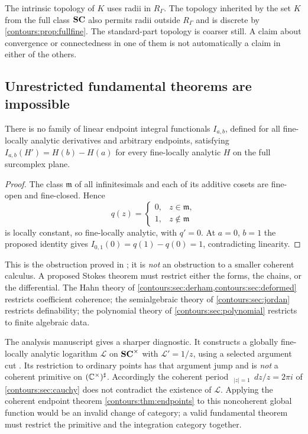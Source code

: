 \documentclass[11pt,letterpaper]{article}
\theoremstyle{definition}
\theoremstyle{remark}
\newcommand{\m}{\mathfrak m}\newcommand{\st}{\operatorname{st}}
\newcommand{\HCoint}{\mathop{\oint^{\!H}}\nolimits}
\newcommand{\sh}{^{\sharp}}\newcommand{\dd}{\,d}
\numberwithin{equation}{section}
\begin{document}
\begin{remark}
\label{contours:rem:threetopologies}
The intrinsic topology of $K$ uses radii in $R_\Gamma$. The topology inherited by
the set $K$ from the full class $\mathbf{SC}$ also permits radii outside $R_\Gamma$ and is
discrete by \cref{contours:prop:fullfine}. The standard-part topology is coarser
still. A claim about convergence or connectedness in one of them is not
automatically a claim in either of the others.
\end{remark}

\subsection{Unrestricted fundamental theorems are impossible}
\begin{proposition}
\label{contours:prop:noftc}
There is no family of linear endpoint integral functionals $I_{a,b}$, defined for
all fine-locally analytic derivatives and arbitrary endpoints, satisfying
$I_{a,b}(H')=H(b)-H(a)$ for every fine-locally analytic $H$ on the full surcomplex
plane.
\end{proposition}
\begin{proof}
The class $\m$ of all infinitesimals and each of its additive cosets are fine-open
and fine-closed. Hence
\[
  q(z)=\begin{cases}0,&z\in\m,\\ 1,&z\notin\m\end{cases}
\]
is locally constant, so fine-locally analytic, with $q'=0$. At $a=0$, $b=1$ the
proposed identity gives $I_{0,1}(0)=q(1)-q(0)=1$, contradicting linearity.
\end{proof}

This is the obstruction proved in \cite[\S3]{Analysis}; it is \emph{not} an
obstruction to a smaller coherent calculus. A proposed Stokes theorem must restrict
either the forms, the chains, or the differential. The Hahn theory of
\cref{contours:sec:derham,contours:sec:deformed} restricts coefficient coherence;
the semialgebraic theory of \cref{contours:sec:jordan} restricts definability; the
polynomial theory of \cref{contours:sec:polynomial} restricts to finite algebraic
data.

The analysis manuscript gives a sharper diagnostic. It constructs a globally
fine-locally analytic logarithm $\mathcal L$ on $\mathbf{SC}^\times$ with
$\mathcal L'=1/z$, using a selected argument cut
\cite[section on global logarithms]{Analysis}. Its restriction to ordinary points
has that argument jump and is \emph{not} a coherent primitive on
$(\C^\times)\sh$. Accordingly the coherent period
$\HCoint_{|z|=1}\dd z/z=2\pi i$ of \cref{contours:sec:cauchy} does not contradict
the existence of $\mathcal L$. Applying the coherent endpoint theorem
\cref{contours:thm:endpoints} to this noncoherent global function would be an
invalid change of category; a valid fundamental theorem must restrict the primitive
and the integration category together.
\end{document}
